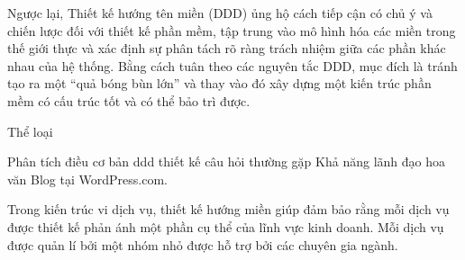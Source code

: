 Ngược lại, Thiết kế hướng tên miền (DDD) ủng hộ cách tiếp cận có chủ ý và chiến lược đối với thiết kế phần mềm, tập trung vào mô hình hóa các miền trong thế giới thực và xác định sự phân tách rõ ràng trách nhiệm giữa các phần khác nhau của hệ thống. Bằng cách tuân theo các nguyên tắc DDD, mục đích là tránh tạo ra một “quả bóng bùn lớn” và thay vào đó xây dựng một kiến ​​trúc phần mềm có cấu trúc tốt và có thể bảo trì được.


Thể loại

Phân tích
điều cơ bản
ddd
thiết kế
câu hỏi thường gặp
Khả năng lãnh đạo
hoa văn
Blog tại WordPress.com.







Trong kiến trúc vi dịch vụ, thiết kế hướng miền giúp đảm bảo rằng mỗi dịch vụ được thiết kế phản ánh một phần cụ thể của lĩnh vực kinh doanh. Mỗi dịch vụ được quản lí bởi một nhóm nhỏ được hỗ trợ bởi các chuyên gia ngành.


